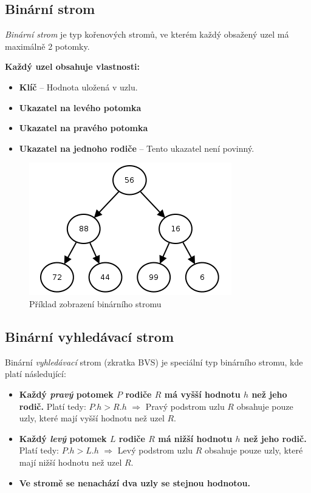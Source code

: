 \documentclass[
  biblatex=false,
  font=serif,
  glossaries=false,
  tables=false,
  theorems=false,
  index
]{kidiplom}
\begin{document}
\subsection{Binární strom}
\begin{definition}
\textit{Binární strom} je typ kořenových stromů, ve kterém každý obsažený uzel má maximálně 2 potomky.
\end{definition}
\smallskip

\noindent\textbf{Každý uzel obsahuje vlastnosti:}
\begin{itemize}
\item \textbf{Klíč} -- Hodnota uložená v uzlu.
\item \textbf{Ukazatel na levého potomka}
\item \textbf{Ukazatel na pravého potomka}
\item \textbf{Ukazatel na jednoho rodiče} -- Tento ukazatel není povinný.
\end{itemize}

\begin{figure}[h!]
\centering
	\includegraphics[scale=0.9]{obrazky/3BinarniStrom.png}
	\caption{Příklad zobrazení binárního stromu}
\end{figure}


\medskip
\subsection{Binární vyhledávací strom}
\indent\indent Binární \textit{vyhledávací} strom (zkratka BVS) je speciální typ binárního stromu, kde platí následující:
\begin{itemize}
\item \textbf {Každý \textit{pravý} potomek $P$ rodiče $R$ má vyšší hodnotu $h$ než jeho rodič.} Platí tedy: $P.h > R.h$ $\Rightarrow$ Pravý podstrom uzlu $R$ obsahuje pouze uzly, které mají vyšší hodnotu než uzel $R$. 
\item \textbf {Každý \textit{levý} potomek $L$ rodiče $R$ má nižší hodnotu $h$ než jeho rodič.} Platí tedy: $P.h > L.h$ $\Rightarrow$ Levý podstrom uzlu $R$ obsahuje pouze uzly, které mají nižší hodnotu než uzel $R$. 
\item \textbf {Ve stromě se nenachází dva uzly se stejnou hodnotou.}
\end{itemize} 
\end{document}
